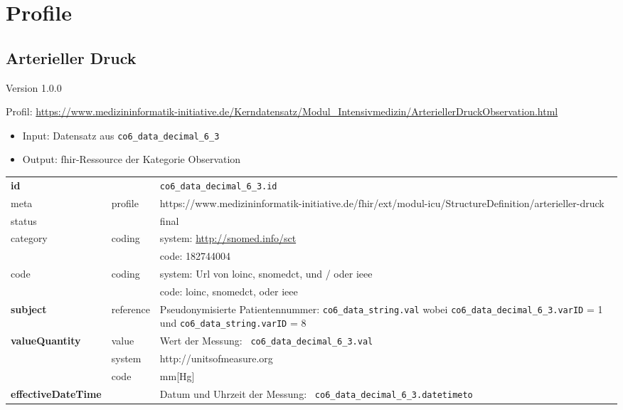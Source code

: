 \section{Profile} \label{sec:profil}

\subsection{Arterieller Druck} 
\noindent Version 1.0.0

\noindent Profil: \url{https://www.medizininformatik-initiative.de/Kerndatensatz/Modul_Intensivmedizin/ArteriellerDruckObservation.html}

\begin{itemize}
\item Input: Datensatz aus \texttt{co6\_data\_decimal\_6\_3}
\item Output: \ac{fhir}-Ressource der Kategorie \glqq Observation\grqq{}
\end{itemize}

\begin{longtable}{|l|l|p{7.5cm}|}
        \hline
        \rowcolor{lightgray} \multicolumn{3}{|l|}{Data Mapping (inhaltlich)} \\ \hline
        \textbf{id} &  & \texttt{co6\_data\_decimal\_6\_3.id} \\ \hline
	meta & profile & https://www.medizininformatik-initiative.de/fhir/ext/modul-icu/StructureDefinition/arterieller-druck \\ \hline 
	status &  & final   \\ \hline 
	category & coding & system: \url{http://snomed.info/sct} \\
\cline{3-3}
	& & code: 182744004 \\ \hline
	code & coding & system: Url von \ac{loinc}, \ac{snomedct}, und / oder \ac{ieee} \\ 
	\cline{3-3} 
	 &  & code: \ac{loinc}, \ac{snomedct}, oder \ac{ieee} \\ \hline
	 \textbf{subject} & reference & Pseudonymisierte Patientennummer: \texttt{co6\_data\_string.val} wobei \texttt{co6\_data\_decimal\_6\_3.varID} = 1 und \texttt{co6\_data\_string.varID} = 8 \\ \hline
	 \textbf{valueQuantity}  & value & Wert der Messung: \texttt{
co6\_data\_decimal\_6\_3.val} \\
        \cline{2-3}
         & system & http://unitsofmeasure.org \\
         \cline{2-3}
         & code &
mm[Hg]
\\ \hline
     \textbf{effectiveDateTime}  &  & Datum und Uhrzeit der Messung: \texttt{
co6\_data\_decimal\_6\_3.datetimeto} \\ \hline
\end{longtable}

